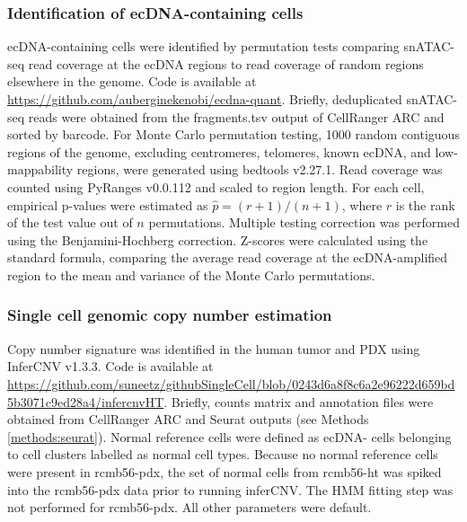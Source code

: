 \subsubsection{Identification of ecDNA-containing cells}
ecDNA-containing cells were identified by permutation tests comparing snATAC-seq read coverage at the ecDNA regions to read coverage of random regions elsewhere in the genome. Code is available at \url{https://github.com/auberginekenobi/ecdna-quant}. Briefly, deduplicated snATAC-seq reads were obtained from the fragments.tsv output of CellRanger ARC and sorted by barcode. For Monte Carlo permutation testing, 1000 random contiguous regions of the genome, excluding centromeres, telomeres, known ecDNA, and low-mappability regions, were generated using bedtools v2.27.1\cite{bedtools}. Read coverage was counted using PyRanges v0.0.112\cite{pyranges_2020} and scaled to region length. For each cell, empirical p-values were estimated as $\hat{p} = (r+1)/(n+1)$, where $r$ is the rank of the test value out of $n$ permutations\cite{north_2002}. Multiple testing correction was performed using the Benjamini-Hochberg correction. Z-scores were calculated using the standard formula, comparing the average read coverage at the ecDNA-amplified region to the mean and variance of the Monte Carlo permutations. 
\subsubsection{Single cell genomic copy number estimation}
Copy number signature was identified in the human tumor and PDX using InferCNV v1.3.3\cite{inferCNV_2019}. Code is available at \newline \url{https://github.com/suneetz/githubSingleCell/blob/0243d6a8f8c6a2e96222d659bd5b3071c9ed28a4/infercnvHT}. Briefly, counts matrix and annotation files were obtained from CellRanger ARC and Seurat outputs (see Methods \ref{methods:seurat}). Normal reference cells were defined as ecDNA- cells belonging to cell clusters labelled as normal cell types. Because no normal reference cells were present in \acrshort{rcmb56-pdx}, the set of normal cells from \acrshort{rcmb56-ht} was spiked into the \acrshort{rcmb56-pdx} data prior to running inferCNV. The HMM fitting step was not performed for \acrshort{rcmb56-pdx}. All other parameters were default.
